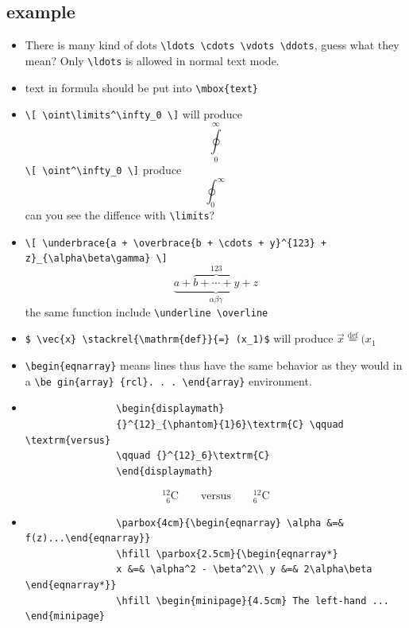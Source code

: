 \documentclass[a4paper,12pt,twoside]{book}
\begin{document}
		\subsection{example}
			\begin{itemize}
			\item There is many kind of dots \verb=\ldots \cdots \vdots \ddots=, guess what they mean? Only \verb=\ldots= is allowed in normal text mode.
			\item text in formula should be put into \verb=\mbox{text}=
			\item \verb=\[ \oint\limits^\infty_0 \]= will produce \[ \oint\limits^\infty_0 \]
				\verb=\[ \oint^\infty_0 \]= produce \[ \oint^\infty_0 \]
				can you see the diffence with \verb=\limits=?
			\item \verb=\[ \underbrace{a + \overbrace{b + \cdots + y}^{123} + z}_{\alpha\beta\gamma} \]=
				\[ \underbrace{a + \overbrace{b + \cdots + y}^{123} + z}_{\alpha\beta\gamma} \]
				the same function include \verb=\underline \overline=
			\item  \verb!$ \vec{x} \stackrel{\mathrm{def}}{=} (x_1)$! will produce
				$ \vec{x} \stackrel{\mathrm{def}}{=} (x_1$
			\item  \verb=\begin{eqnarray}= means lines thus have the same behavior as they would in a \verb=\be gin{array} {rcl}. . . \end{array}= environment.
			\item
				\begin{verbatim}
				\begin{displaymath}
				{}^{12}_{\phantom}{1}6}\textrm{C} \qquad \textrm{versus}
				\qquad {}^{12}_6}\textrm{C}
				\end{displaymath}
				\end{verbatim}
				
				\begin{displaymath}
				{}^{12}_{\phantom{1}6}\textrm{C} \qquad \textrm{versus}
				\qquad {}^{12}_6\textrm{C}
				\end{displaymath}
			\item
				\begin{verbatim}
				\parbox{4cm}{\begin{eqnarray} \alpha &=& f(z)...\end{eqnarray}}
				\hfill \parbox{2.5cm}{\begin{eqnarray*}
				x &=& \alpha^2 - \beta^2\\ y &=& 2\alpha\beta \end{eqnarray*}}
				\hfill \begin{minipage}{4.5cm} The left-hand ... \end{minipage}
				\end{verbatim}
				

\end{itemize}
\end{document}
